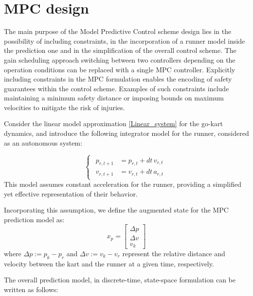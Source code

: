 \documentclass[a4paper,12pt,oneside]{book}
\begin{document}
\newpage
\newpage
\section{MPC design}
The main purpose of the Model Predictive Control scheme design lies in the possibility of including constraints, in the incorporation of a runner model inside the prediction one and in the simplification of the overall control scheme.
The gain scheduling approach switching between two controllers depending on the operation conditions can be replaced with a single MPC controller.
Explicitly including constraints in the MPC formulation enables the encoding of safety guarantees within the control scheme. Examples of such constraints include maintaining a minimum safety distance or imposing bounds on maximum velocities to mitigate the risk of injuries.

\bigskip
Consider the linear model approximation \ref{Linear_system} for the go-kart dynamics, and introduce the following integrator model for the runner, considered as an autonomous system:

\begin{equation}
\begin{cases}
	\begin{aligned}
		p_{r,t+1} &= p_{r,t} + dt \, v_{r,t} \\
		v_{r,t+1} &= v_{r,t} + dt \, a_{r,t}
	\end{aligned}
\end{cases}
\label{Runner_model}
\end{equation}
This model assumes constant acceleration for the runner, providing a simplified yet effective representation of their behavior.

Incorporating this assumption, we define the augmented state for the MPC prediction model as:
\begin{equation}
    x_p = 
    \begin{bmatrix}
        \Delta p  \\
        \Delta v \\
        v_k
    \end{bmatrix}
\end{equation}
where $\Delta p := p_k - p_r$ and $\Delta v := v_k - v_r$ represent the relative distance and velocity between the kart and the runner at a given time, respectively.

The overall prediction model, in discrete-time, state-space formulation can be written as follows:
\end{document}
